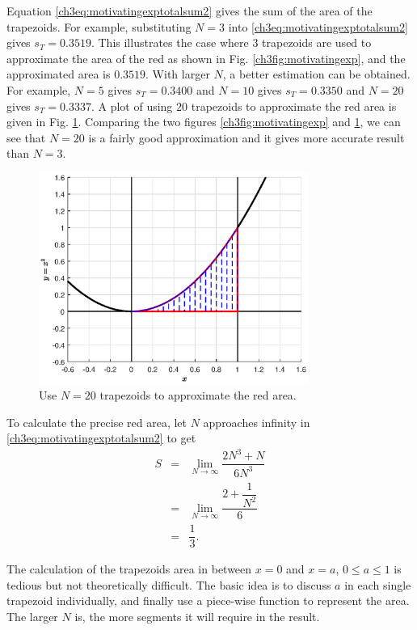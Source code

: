 Equation \eqref{ch3eq:motivatingexptotalsum2} gives the sum of the area of the trapezoids. For example, substituting $N=3$ into \eqref{ch3eq:motivatingexptotalsum2} gives $s_{T} = 0.3519$. This illustrates the case where 3 trapezoids are used to approximate the area of the red as shown in Fig. \ref{ch3fig:motivatingexp}, and the approximated area is $0.3519$. With larger $N$, a better estimation can be obtained. For example, $N=5$ gives $s_{T} = 0.3400$ and $N=10$ gives $s_{T} = 0.3350$ and $N=20$ gives $s_{T} = 0.3337$. A plot of using $20$ trapezoids to approximate the red area is given in Fig. \ref{ch3fig:motivatingexpN20}. Comparing the two figures \ref{ch3fig:motivatingexp} and \ref{ch3fig:motivatingexpN20}, we can see that $N=20$ is a fairly good approximation and it gives more accurate result than $N=3$.
\begin{figure}
\centering
\includegraphics[width=250pt]{chapters/part-1/figures/motivatingexpN20.eps}
\caption{Use $N=20$ trapezoids to approximate the red area.} \label{ch3fig:motivatingexpN20}
\end{figure}

To calculate the precise red area, let $N$ approaches infinity in \eqref{ch3eq:motivatingexptotalsum2} to get
\begin{eqnarray}
    S &=& \lim_{N\rightarrow\infty}\dfrac{2N^3 + N}{6N^3} \nonumber \\
    &=& \lim_{N\rightarrow\infty}\dfrac{2 + \dfrac{1}{N^2}}{6} \nonumber \\
    &=& \dfrac{1}{3}. \nonumber
\end{eqnarray}

The calculation of the trapezoids area in between $x=0$ and $x=a$, $0 \leq a \leq 1$ is tedious but not theoretically difficult. The basic idea is to discuss $a$ in each single trapezoid individually, and finally use a piece-wise function to represent the area. The larger $N$ is, the more segments it will require in the result.

